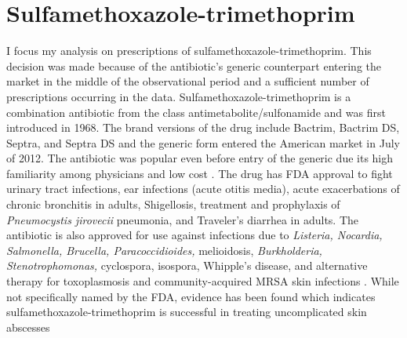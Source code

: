 \section{Sulfamethoxazole-trimethoprim}
\indent I focus my analysis on prescriptions of sulfamethoxazole-trimethoprim. This decision was made because of the antibiotic's generic counterpart entering the market in the middle of the observational period and a sufficient number of prescriptions occurring in the data. Sulfamethoxazole-trimethoprim is a combination antibiotic from the class antimetabolite/sulfonamide and was first introduced in 1968. The brand versions of the drug include Bactrim, Bactrim DS, Septra, and Septra DS and the generic form entered the American market in July of 2012. The antibiotic was popular even before entry of the generic due its high familiarity among physicians and low cost \cite{noauthor_sulfamethoxazole_nodate,ho_considerations_2011}. The drug has FDA approval to fight urinary tract infections, ear infections (acute otitis media), acute exacerbations of chronic bronchitis in adults, Shigellosis, treatment and prophylaxis of \textit{Pneumocystis jirovecii} pneumonia, and Traveler's diarrhea in adults. The antibiotic is also approved for use against infections due to \textit{Listeria, Nocardia, Salmonella, Brucella, Paracoccidioides,} melioidosis, \textit{Burkholderia, Stenotrophomonas,} cyclospora, isospora, Whipple's disease, and alternative therapy for toxoplasmosis and community-acquired MRSA skin infections \cite{schlossberg_antibiotics_2017}. While not specifically named by the FDA, evidence has been found which indicates sulfamethoxazole-trimethoprim is successful in treating uncomplicated skin abscesses \cite{noauthor_trimethoprimsulfamethoxazole_nodate}\\
